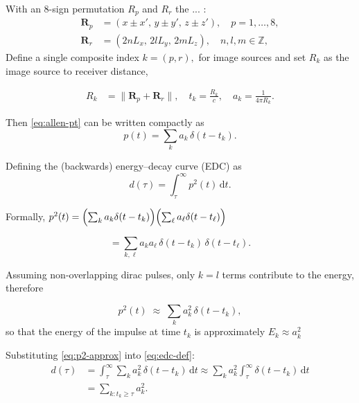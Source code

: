 \documentclass[conference]{IEEEtran}
\begin{document}
With an 8-sign permutation $R_p$ and $R_r$ the ... :
\begin{align}
\mathbf R_p &= (x \pm x',\, y \pm y',\, z \pm z'), \quad p = 1,\dots,8,
\label{eq:Rp-def} \\[3pt]
\mathbf R_r &= (2nL_x,\, 2lL_y,\, 2mL_z), \quad n,l,m \in \mathbb Z,
\label{eq:Rr-def}
\end{align}
Define a single composite index
$k=(p,r),$ for image sources and set $R_k$ as the image source to receiver distance,

\begin{align}
R_k &= \bigl\lVert \mathbf R_p + \mathbf R_r \bigr\rVert,
 \quad 
t_k = \frac{R_k}{c},
\quad a_k = \frac{1}{4\pi R_k}.
\end{align}

Then \eqref{eq:allen-pt} can be written compactly as
\begin{equation}
p(t) = \sum_{k} a_k \,\delta(t - t_k).
\label{eq:p-compact}
\end{equation}

Defining the (backwards) energy–decay curve (EDC) as
\begin{equation}
d(\tau) = \int_{\tau}^{\infty} p^2(t)\,\mathrm dt.
\label{eq:edc-def}
\end{equation}

Formally, $p^2(t)
  = \Bigl( \sum_k a_k \delta(t-t_k) \Bigr)
    \Bigl( \sum_\ell a_\ell \delta(t-t_\ell) \Bigr) $

\begin{equation}
   = \sum_{k,\ell} a_k a_\ell \,\delta(t-t_k)\,\delta(t-t_\ell).
\label{eq:p2-formal}
\end{equation}

Assuming non-overlapping dirac pulses, only $k=l$ terms contribute to the energy, therefore

\begin{equation}
p^2(t)
  \;\approx\; \sum_{k} a_k^2 \,\delta(t-t_k),
\label{eq:p2-approx}
\end{equation}
so that the energy of the impulse at time $t_k$ is approximately $E_k \approx a_k^2$

Substituting \eqref{eq:p2-approx} into \eqref{eq:edc-def}:
\begin{align}
d(\tau)
  &= \int_{\tau}^{\infty}
       \sum_k a_k^2 \,\delta(t-t_k)\,\mathrm dt
     \approx \sum_k a_k^2 \int_{\tau}^{\infty} \delta(t-t_k)\,\mathrm dt
  \\[3pt]
  &= \sum_{k: t_k \ge \tau} a_k^2.
\end{align}
\end{document}
